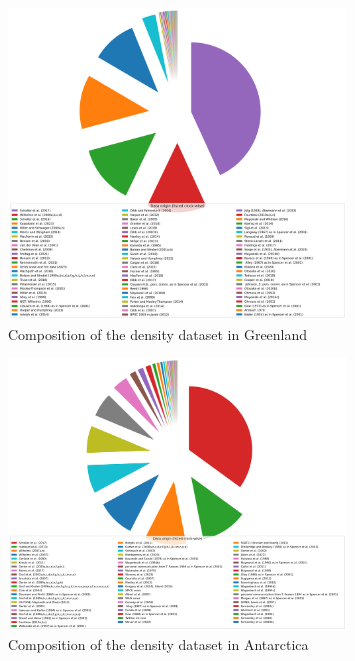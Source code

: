 \documentclass[journal abbreviation, manuscript]{copernicus}
\begin{document}
\begin{figure}[!htb]
\caption{Composition of the density dataset in Greenland}
\centering
\includegraphics[width=0.8\textwidth]{figures/density_dataset_composition_greenland.png}
\end{figure}


\begin{figure}[!htb]
\caption{Composition of the density dataset in Antarctica}
\centering
\includegraphics[width=0.8\textwidth]{figures/density_dataset_composition_antarctica.png}
\end{figure}

\FloatBarrier
\end{document}
